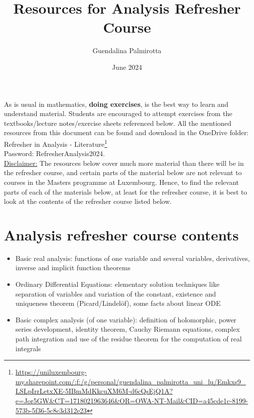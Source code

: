 \documentclass{article}
\title{Resources for Analysis Refresher Course}
\author{Guendalina Palmirotta}
\date{June 2024}
\begin{document}
\maketitle


As is usual in mathematics, \textbf{doing exercises},
is the best way to learn and understand material. Students are encouraged to attempt exercises from
the textbooks/lecture notes/exercise sheets referenced below. All the mentioned resources from this document can be found and download in the OneDrive folder:\\
Refresher in Analysis - Literature\footnote{
\url{https://uniluxembourg-my.sharepoint.com/:f:/g/personal/guendalina_palmirotta_uni_lu/Emkxs9_LSLpIrrLetxXE-5IBmMdKkcuXM6M-d6cQsEjQ1A?e=Jor5GW&CT=1718021963646&OR=OWA-NT-Mail&CID=a45cde1c-8199-573b-5f36-5c8c3d312e23}}\\
Password: RefresherAnalysis2024.\\

\noindent
\underline{Disclaimer:} The resources below cover much more material than there will be in the refresher
course, and certain parts of the material below are not relevant to courses in the Masters programme
at Luxembourg. Hence, to find the relevant parts of each of the materials below, at least for the
refresher course, it is best to look at the contents of the refresher course listed below.




\section*{Analysis refresher course contents}
\begin{itemize}
    \item Basic real analysis: functions of one variable and several variables, derivatives, inverse and implicit function theorems
    \item Ordinary Differential Equations: elementary solution techniques like separation of variables and variation of the constant, existence and uniqueness theorem (Picard/Lindelöf), some facts about linear ODE
    \item Basic complex analysis (of one variable): definition of holomorphic, power series development, identity theorem, Cauchy Riemann equations, complex path integration and use of the residue theorem for the computation of real integrals
\end{itemize}
\newpage
\end{document}
